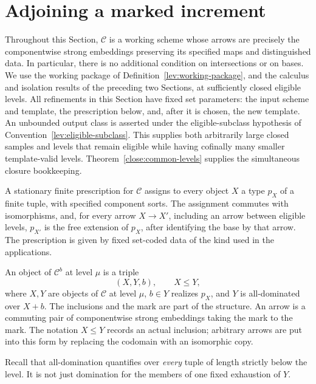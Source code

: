 \section{Adjoining a marked increment}
\label{mark:section-increments}

Throughout this Section, \(\mathcal C\) is a working scheme whose arrows
are precisely the componentwise strong embeddings preserving its
specified maps and distinguished data.  In particular, there is no
additional condition on intersections or on bases.  We use the working
package of Definition~\ref{lev:working-package}, and the calculus and
isolation results of the preceding two Sections, at sufficiently closed
eligible levels.  All refinements in this Section have fixed set
parameters: the input scheme and template, the prescription below, and,
after it is chosen, the new template.
An unbounded output class is asserted under the eligible-subclass
hypothesis of Convention~\ref{lev:eligible-subclass}.  This supplies both
arbitrarily large closed samples and levels that remain eligible while
having cofinally many smaller template-valid levels.
Theorem~\ref{close:common-levels} supplies the simultaneous closure
bookkeeping.

\begin{definition}
\label{mark:definition}
A stationary finite prescription for \(\mathcal C\) assigns to every
object \(X\) a type \(p_X\) of a finite tuple, with specified component
sorts.  The assignment commutes with isomorphisms, and, for every arrow
\(X\to X'\), including an arrow between eligible levels, \(p_{X'}\) is
the free extension of \(p_X\), after identifying the base by that arrow.
The prescription is given by fixed set-coded data of the kind used in
the applications.

An object of \(\mathcal C^b\) at level \(\mu\) is a triple
\[
                (X,Y,b),\qquad X\leq Y,
\]
where \(X,Y\) are objects of \(\mathcal C\) at level \(\mu\),
\(b\in Y\) realizes \(p_X\), and \(Y\) is all-dominated over \(X+b\).
The inclusions and the mark are part of the structure.  An arrow is a
commuting pair of componentwise strong embeddings taking the mark to
the mark.  The notation \(X\leq Y\) records an actual inclusion; arbitrary
arrows are put into this form by replacing the codomain with an
isomorphic copy.
\end{definition}

Recall that all-domination quantifies over \emph{every} tuple of length
strictly below the level.  It is not just domination for the members of
one fixed exhaustion of \(Y\).

